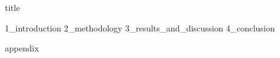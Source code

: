 \documentclass{article}
\begin{document}
{title}

\frontmatter

\renewcommand{\abstractname}{\LARGE Abstract}  %

\begin{abstract}
    {0_abstract}
\end{abstract}
\clearpage



\tableofcontents

\listoffigures
\listoftables

\mainmatter


\twocolumn
{1_introduction}
{2_methodology}
{3_results_and_discussion}
{4_conclusion}


\onecolumn
\newpage
%
\printbibliography




\addappendix
{appendix}


\end{document}
